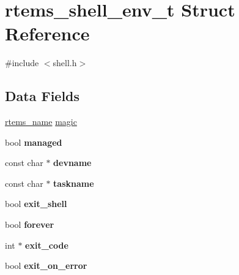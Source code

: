 \hypertarget{structrtems__shell__env__t}{}\section{rtems\+\_\+shell\+\_\+env\+\_\+t Struct Reference}
\label{structrtems__shell__env__t}


{\ttfamily \#include $<$shell.\+h$>$}

\subsection*{Data Fields}
\begin{DoxyCompactItemize}
\item 
\mbox{\hyperlink{group__ClassicTasks_ga55fb63c49f68c0cbd9bee004da15b1fd}{rtems\+\_\+name}} \mbox{\hyperlink{structrtems__shell__env__t_a93086f7e4eb4ef1bb78b0e0da3a58eba}{magic}}
\item 
\mbox{\label{structrtems__shell__env__t_a8ceaf818a7416ba8b38622e107f1d84f}} 
bool {\bfseries managed}
\item 
\mbox{\label{structrtems__shell__env__t_a319a21ce115175db3dc79f617a3de7d3}} 
const char $\ast$ {\bfseries devname}
\item 
\mbox{\label{structrtems__shell__env__t_a3ac0bdd137d43d442508a35b54e3f8d3}} 
const char $\ast$ {\bfseries taskname}
\item 
\mbox{\label{structrtems__shell__env__t_af705a4964d99dfcb4c0b27470e94694d}} 
bool {\bfseries exit\+\_\+shell}
\item 
\mbox{\label{structrtems__shell__env__t_a2c220ff7cc9a2230d4cc73eb489907e5}} 
bool {\bfseries forever}
\item 
\mbox{\label{structrtems__shell__env__t_ad6e52b06f32362e4ddf22fac8f153bb3}} 
int $\ast$ {\bfseries exit\+\_\+code}
\item 
\mbox{\label{structrtems__shell__env__t_a30cbba81be265b7f394fd6ebd7f54567}} 
bool {\bfseries exit\+\_\+on\+\_\+error}
\item 

\end{DoxyCompactItemize}
